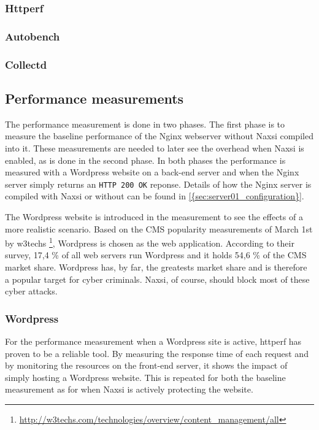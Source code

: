 \documentclass[Methods]{subfiles}
\begin{document}
\subsubsection{Httperf}
%

\subsubsection{Autobench}


\subsubsection{Collectd}


\subsection{Performance measurements}
The performance measurement is done in two phases. The first phase is to measure the baseline performance of the Nginx webserver without Naxsi compiled into it. These measurements are needed to later see the overhead when Naxsi is enabled, as is done in the second phase. In both phases the performance is measured with a Wordpress website on a back-end server and when the Nginx server simply returns an \verb+HTTP 200 OK+ reponse. Details of how the Nginx server is compiled with Naxsi or without can be found in \ref{{sec:server01_configuration}}.

The Wordpress website is introduced in the measurement to see the effects of a more realistic scenario. Based on the \ac{CMS} popularity measurements of March 1st by w3techs \footnote{\url{http://w3techs.com/technologies/overview/content_management/all}}, Wordpress is chosen as the web application. According to their survey, 17,4 \% of all web servers run Wordpress and it holds 54,6 \% of the CMS market share. Wordpress has, by far, the greatests market share and is therefore a popular target for cyber criminals. Naxsi, of course, should block most of these cyber attacks.

\subsubsection{Wordpress}
For the performance measurement when a Wordpress site is active, httperf has proven to be a reliable tool. By measuring the response time of each request and by monitoring the resources on the front-end server, it shows the impact of simply hosting a Wordpress website. This is repeated for both the baseline measurement as for when Naxsi is actively protecting the website.
\end{document}

